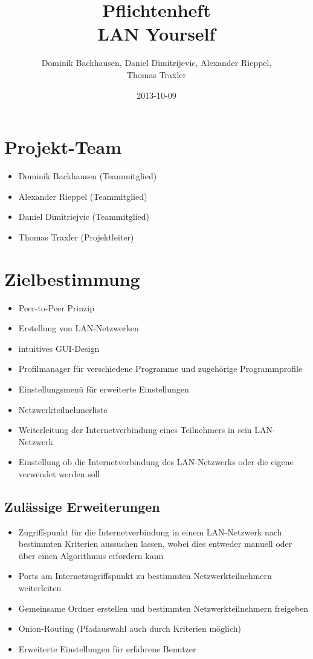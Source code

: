 \documentclass[a4paper,12pt]{scrreprt}
\begin{document}
\author{Dominik Backhausen, Daniel Dimitrijevic, Alexander Rieppel,\\ Thomas Traxler}
\title{Pflichtenheft\\ LAN Yourself}
\date{2013-10-09}
\maketitle
\tableofcontents

\chapter{Projekt-Team}
	\begin{itemize}
	\item Dominik Backhausen (Teammitglied)
	\item Alexander Rieppel (Teammitglied)
	\item Daniel Dimitriejvic (Teammitglied)
	\item Thomas Traxler (Projektleiter)
	\end{itemize}
	
	
\chapter{Zielbestimmung}
	\begin{itemize}
	\item Peer-to-Peer Prinzip
	\item Erstellung von LAN-Netzwerken
	\item intuitives GUI-Design
	\item Profilmanager für verschiedene Programme und zugehörige Programmprofile
	\item Einstellungsmenü für erweiterte Einstellungen
	\item Netzwerkteilnehmerliste
	\item Weiterleitung der Internetverbindung eines Teilnehmers in sein LAN-Netzwerk
	\item Einstellung ob die Internetverbindung des LAN-Netzwerks oder die eigene verwendet werden soll
	\end{itemize}
	
	\section{Zulässige Erweiterungen}
	
	\begin{itemize}
	\item Zugriffspunkt für die Internetverbindung in einem LAN-Netzwerk nach bestimmten Kriterien aussuchen lassen, wobei dies entweder manuell oder über einen Algorithmus erfordern kann
	\item Ports am Internetzugriffspunkt zu bestimmten Netzwerkteilnehmern weiterleiten
	\item Gemeinsame Ordner erstellen und bestimmten Netzwerkteilnehmern freigeben
	\item Onion-Routing (Pfadauswahl auch durch Kriterien möglich)
	\item Erweiterte Einstellungen für erfahrene Benutzer
	
	\end{itemize}
	
\end{document}
